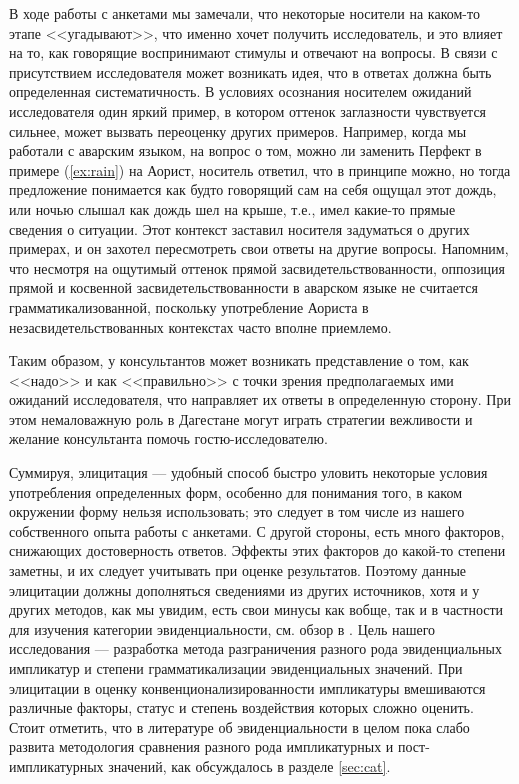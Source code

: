 \par В ходе работы с анкетами мы замечали, что некоторые носители на каком-то этапе <<угадывают>>, что именно хочет получить исследователь, и это влияет на то, как говорящие воспринимают стимулы и отвечают на вопросы. В связи с присутствием исследователя может возникать идея, что в ответах должна быть определенная систематичность. В условиях осознания носителем ожиданий исследователя один яркий пример, в котором оттенок заглазности чувствуется сильнее, может вызвать переоценку других примеров. Например, когда мы работали с аварским языком, на вопрос о том, можно ли заменить Перфект в примере (\ref{ex:rain}) на Аорист, носитель ответил, что в принципе можно, но тогда предложение понимается как будто говорящий сам на себя ощущал этот дождь, или ночью слышал как дождь шел на крыше, т.е., имел какие-то прямые сведения о ситуации. Этот контекст заставил носителя задуматься о других примерах, и он захотел пересмотреть свои ответы на другие вопросы. Напомним, что несмотря на ощутимый оттенок прямой засвидетельствованности, оппозиция прямой и косвенной засвидетельствованности в аварском языке не считается грамматикализованной, поскольку употребление Аориста в незасвидетельствованных контекстах часто вполне приемлемо.


Таким образом, у консультантов может возникать представление о том, как <<надо>> и как <<правильно>> с точки зрения предполагаемых ими ожиданий исследователя, что направляет их ответы в определенную сторону. При этом немаловажную роль в Дагестане могут играть стратегии вежливости и желание консультанта помочь гостю-исследователю.
\par Суммируя, элицитация --- удобный способ быстро уловить некоторые условия употребления определенных форм, особенно для понимания того, в каком окружении форму нельзя использовать; это следует в том числе из нашего собственного опыта работы с анкетами. С другой стороны, есть много факторов, снижающих достоверность ответов. Эффекты этих факторов до какой-то степени заметны, и их следует учитывать при оценке результатов. Поэтому данные элицитации должны дополняться сведениями из других источников, хотя и у других методов, как мы увидим, есть свои минусы как вобще, так и в частности для изучения категории эвиденциальности, см. обзор в \citep{kittila2018}. Цель нашего исследования --- разработка метода разграничения разного рода эвиденциальных импликатур и степени грамматикализации эвиденциальных значений. При элицитации в оценку конвенционализированности импликатуры вмешиваются различные факторы, статус и степень воздействия которых сложно оценить. Стоит отметить, что в литературе об эвиденциальности в целом пока слабо развита методология сравнения разного рода импликатурных и пост-импликатурных значений, как обсуждалось в разделе \ref{sec:cat}.

